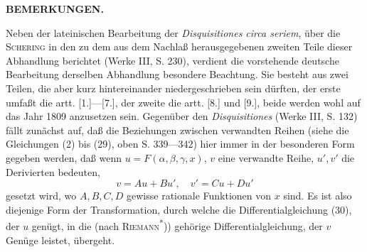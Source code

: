 \begin{center}\textbf{BEMERKUNGEN.}\end{center}
\noindent\hspace*{\parindent}Neben der lateinischen Bearbeitung der \emph{Disquisitiones circa seriem}, über die \textsc{Schering} in den  zu dem aus dem Nachlaß herausgegebenen zweiten Teile dieser Abhandlung berichtet (Werke III, S. 230), verdient die vorstehende deutsche Bearbeitung derselben Abhandlung besondere Beachtung.
Sie besteht aus zwei Teilen, die aber kurz hintereinander niedergeschrieben sein dürften, der erste umfaßt die artt. [1.]—[7.], der zweite die artt. [8.] und [9.], beide werden wohl auf das Jahr 1809 anzusetzen sein.
Gegenüber den \emph{Disquisitiones} (Werke III, S. 132) fällt zunächst auf, daß die Beziehungen zwischen verwandten Reihen (siehe die Gleichungen (2) bis (29), oben S. 339—342) hier immer in der besonderen Form gegeben werden, daß wenn $u=F(\alpha,\beta,\gamma,x)$, $v$ eine verwandte Reihe, $u',v'$ die Derivierten bedeuten,
\[
v=Au+Bu',\quad v'=Cu+Du'
\]
\noindent gesetzt wird, wo $A,B,C,D$ gewisse rationale Funktionen von $x$ sind. Es ist also diejenige Form der Transformation, durch welche die Differentialgleichung (30), der $u$ genügt, in die (nach \textsc{Riemann}\textsuperscript{*}))  gehörige Differentialgleichung, der $v$ Genüge leistet, übergeht.

